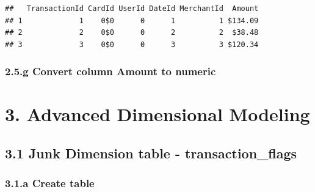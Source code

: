 \documentclass[
]{article}
\newenvironment{Shaded}{\begin{snugshade}}{\end{snugshade}}
\newcommand{\AttributeTok}[1]{\textcolor[rgb]{0.13,0.29,0.53}{#1}}
\newcommand{\DecValTok}[1]{\textcolor[rgb]{0.00,0.00,0.81}{#1}}
\newcommand{\FunctionTok}[1]{\textcolor[rgb]{0.13,0.29,0.53}{\textbf{#1}}}
\newcommand{\NormalTok}[1]{#1}
\newcommand{\OtherTok}[1]{\textcolor[rgb]{0.56,0.35,0.01}{#1}}
\newcommand{\SpecialCharTok}[1]{\textcolor[rgb]{0.81,0.36,0.00}{\textbf{#1}}}
\newcommand{\StringTok}[1]{\textcolor[rgb]{0.31,0.60,0.02}{#1}}
\begin{document}
\begin{verbatim}
##   TransactionId CardId UserId DateId MerchantId  Amount
## 1             1    0$0      0      1          1 $134.09
## 2             2    0$0      0      2          2  $38.48
## 3             3    0$0      0      3          3 $120.34
\end{verbatim}

\subsubsection{2.5.g Convert column Amount to
numeric}\label{g-convert-column-amount-to-numeric}

\begin{Shaded}
\end{Shaded}

\section{3. Advanced Dimensional Modeling}\label{adv-modeling}

\subsection{3.1 Junk Dimension table -
transaction\_flags}\label{junk-dimension-table---transaction_flags}

\subsubsection{3.1.a Create table}\label{a-create-table}

\begin{Shaded}
\end{Shaded}
\end{document}
